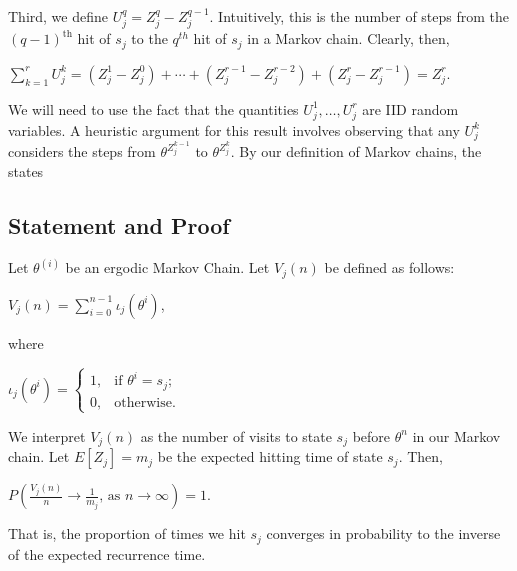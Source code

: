 \documentclass[12pt,twoside]{reedthesis}
\begin{document}
		Third, we define $U_{j}^q = Z_{j}^{q} - Z_{j}^{q-1}$. 
		Intuitively, this is the number of steps from the  $(q-1)^{\textrm{th}}$ hit of $s_j$ to the $q^{th}$ hit of $s_j$ in a Markov chain. 
		Clearly, then,
		\begin{center}
		 $\displaystyle\sum_{k=1}^{r}U_j^k 
		 = (Z_j^1 - Z_j^0) + \cdots + (Z_j^{r-1} - Z_j^{r-2}) + (Z_j^r - Z_j^{r-1}) 
		 = Z_j^r$. 
		 \end{center}
		 We will need to use the fact that the quantities $U_j^1, \ldots, U_j^r$ are IID random variables. 
		 A heuristic argument for this result involves observing that any $U_j^k$ considers the steps from $\theta^{Z_j^{k-1}}$ to $\theta^{Z_j^k}$. By our definition of Markov chains, the states 
		
		\subsection*{Statement and Proof}
		\begin{theorem}
		Let $\theta^{(i)}$ be an ergodic Markov Chain. 
		Let $V_j(n)$ be defined as follows:
		\begin{center}
			$V_j(n) = \displaystyle\sum_{i=0}^{n-1} \iota_j(\theta^{i})$,
		\end{center}
		where
		\begin{center}
			$\iota_j(\theta^i) = \begin{cases} 
				1, & \textrm{if\ \ \ } \theta^i = s_j; \\
				0, & \textrm{otherwise}. 
				\end{cases}
			$
		\end{center}
		We interpret $V_j(n)$ as the number of visits to state $s_j$ before $\theta^n$ in our Markov chain. 
		Let $E[Z_j] = m_j$ be the expected hitting time of state $s_j$. Then,
		\begin{center}
			$P\left(\displaystyle\frac{V_j(n)}{n} \longrightarrow \frac{1}{m_j}
			\textrm{, as } n \rightarrow \infty \right) = 1$.
		\end{center}
		
		That is, the proportion of times we hit $s_j$ converges in probability to the inverse of the expected recurrence time.
		\end{theorem}
		
\end{document}
